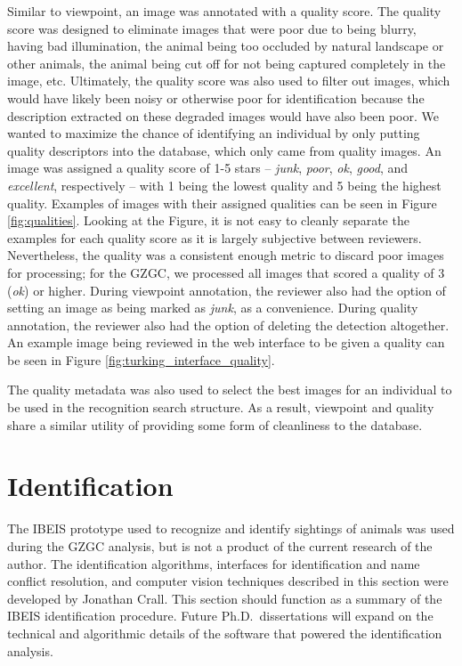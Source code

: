 Similar to viewpoint, an image was annotated with a quality score.  The quality score was designed to eliminate images that were poor due to being blurry, having bad illumination, the animal being too occluded by natural landscape or other animals, the animal being cut off for not being captured completely in the image, etc.  Ultimately, the quality score was also used to filter out images, which would have likely been noisy or otherwise poor for identification because the description extracted on these degraded images would have also been poor.  We wanted to maximize the chance of identifying an individual by only putting quality descriptors into the database, which only came from quality images.  An image was assigned a quality score of 1-5 stars -- \textit{junk}, \textit{poor}, \textit{ok}, \textit{good}, and \textit{excellent}, respectively -- with 1 being the lowest quality and 5 being the highest quality.  Examples of images with their assigned qualities can be seen in Figure \ref{fig:qualities}.  Looking at the Figure, it is not easy to cleanly separate the examples for each quality score as it is largely subjective between reviewers.  Nevertheless, the quality was a consistent enough metric to discard poor images for processing; for the GZGC, we processed all images that scored a quality of 3 (\textit{ok}) or higher.  During viewpoint annotation, the reviewer also had the option of setting an image as being marked as \textit{junk}, as a convenience.  During quality annotation, the reviewer also had the option of deleting the detection altogether.  An example image being reviewed in the web interface to be given a quality can be seen in Figure \ref{fig:turking_interface_quality}.

The quality metadata was also used to select the best images for an individual to be used in the recognition search structure.  As a result, viewpoint and quality share a similar utility of providing some form of cleanliness to the database.  %

\section{Identification} \label{sec:identification}
The IBEIS prototype used to recognize and identify sightings of animals was used during the GZGC analysis, but is not a product of the current research of the author.  The identification algorithms, interfaces for identification and name conflict resolution, and computer vision techniques described in this section were developed by Jonathan Crall.  This section should function as a summary of the IBEIS identification procedure.  Future Ph.D.\ dissertations will expand on the technical and algorithmic details of the software that powered the identification analysis.

